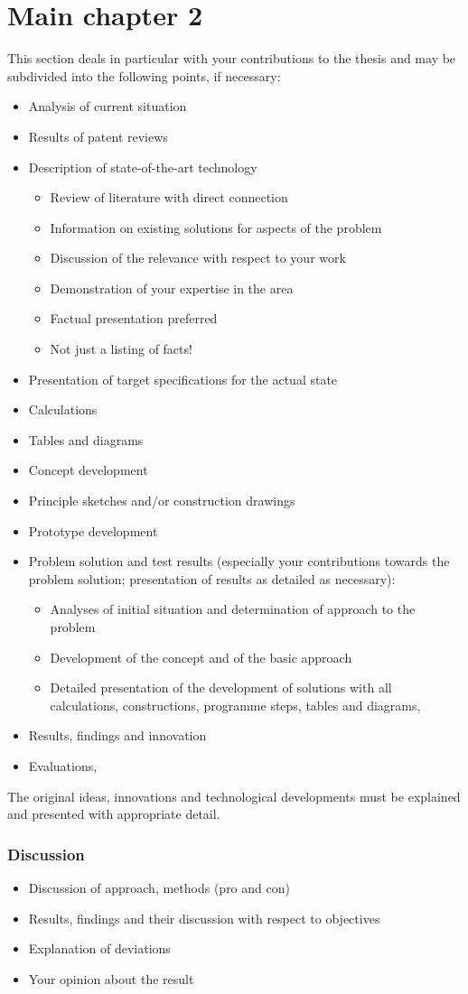 \chapter{Main chapter 2}
This section deals in particular with your contributions to the thesis and may be subdivided into the following points, if necessary:
\begin{itemize}
	\item Analysis of current situation
	\item Results of patent reviews
	\item Description of state-of-the-art technology
	\begin{itemize}
		\item Review of literature with direct connection
		\item Information on existing solutions for aspects of the problem
		\item Discussion of the relevance with respect to your work
		\item Demonstration of your expertise in the area
		\item Factual presentation preferred
		\item Not just a listing of facts!
	\end{itemize}
	\item Presentation of target specifications for the actual state
	\item Calculations
	\item Tables and diagrams
	\item Concept development
	\item Principle sketches and/or construction drawings
	\item Prototype development
	\item Problem solution and test results (especially your contributions towards the problem solution; presentation of results as detailed as necessary):
	\begin{itemize}
		\item Analyses of initial situation and determination of approach to the problem
		\item Development of the concept and of the basic approach
		\item Detailed presentation of the development of solutions with all calculations, constructions, programme steps, tables and diagrams, \etc
	\end{itemize}
	\item Results, findings and innovation
	\item Evaluations, \etc
\end{itemize}	
The original ideas, innovations and technological developments must be explained and presented with appropriate detail.

\newpage
\subsection*{Discussion}
\begin{itemize}
	\item Discussion of approach, methods (pro and con)
	\item Results, findings and their discussion with respect to objectives
	\item Explanation of deviations
	\item Your opinion about the result
\end{itemize}
